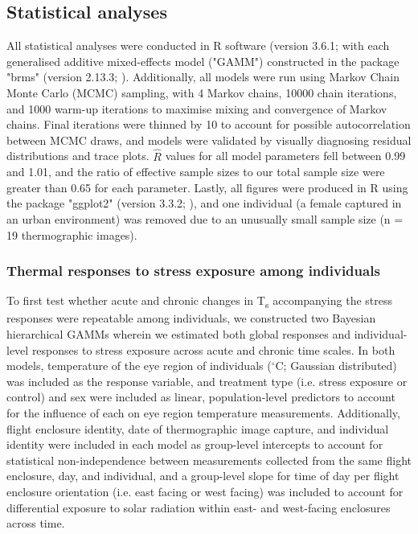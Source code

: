 \documentclass[12pt]{article}
\begin{document}
\subsection{Statistical analyses}
\vspace{0.5cm}

\noindent All statistical analyses were conducted in R software (version 3.6.1; \citealt{rcore_2019} with each generalised additive mixed-effects model ("GAMM") constructed in the package "brms" (version 2.13.3; \citealt{burkner_2017}). Additionally, all models were run using Markov Chain Monte Carlo (MCMC) sampling, with 4 Markov chains, 10000 chain iterations, and 1000 warm-up iterations to maximise mixing and convergence of Markov chains. Final iterations were thinned by 10 to account for possible autocorrelation between MCMC draws, and models were validated by visually diagnosing residual distributions and trace plots. $\hat{R}$ values for all model parameters fell between 0.99 and 1.01, and the ratio of effective sample sizes to our total sample size were greater than 0.65 for each parameter. Lastly, all figures were produced in R using the package "ggplot2" (version 3.3.2; \citealt{wickham_2016}), and one individual (a female captured in an urban environment) was removed due to an unusually small sample size (n = 19 thermographic images).\vspace{0.5cm}

\subsubsection{Thermal responses to stress exposure among individuals} 
\vspace{0.5cm}

\noindent To first test whether acute and chronic changes in T\textsubscript{s} accompanying the stress responses were repeatable among individuals, we constructed two Bayesian hierarchical GAMMs wherein we estimated both global responses and individual-level responses to stress exposure across acute and chronic time scales. In both models, temperature of the eye region of individuals ($^{\circ}$C; Gaussian distributed) was included as the response variable, and treatment type (i.e. stress exposure or control) and sex were included as linear, population-level predictors to account for the influence of each on eye region temperature measurements. Additionally, flight enclosure identity, date of thermographic image capture, and individual identity were included in each model as group-level intercepts to account for statistical non-independence between measurements collected from the same flight enclosure, day, and individual, and a group-level slope for time of day per flight enclosure orientation (i.e. east facing or west facing) was included to account for differential exposure to solar radiation within east- and west-facing enclosures across time. \vspace{1cm}
\end{document}
